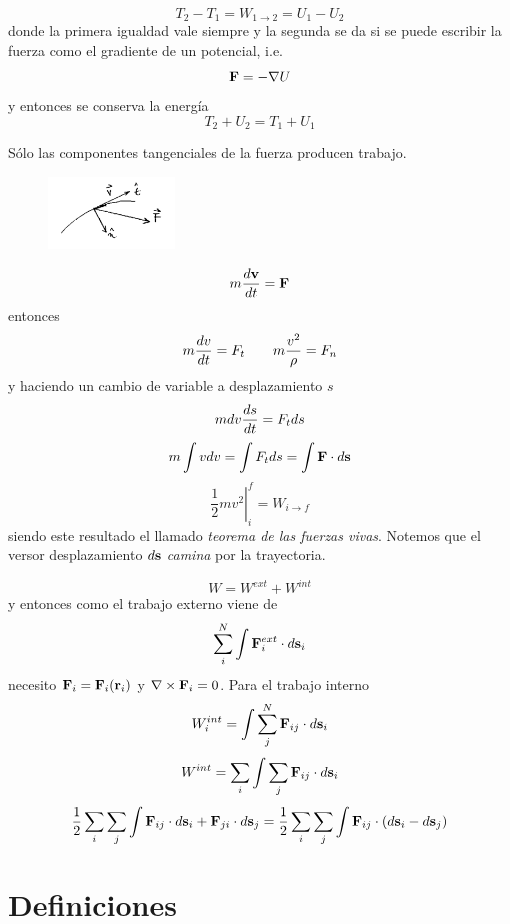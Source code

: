 \documentclass[10pt,oneside]{CBFT_book}
\begin{document}
\[
	T_2 - T_1 = W_{1 \to 2} = U_1 - U_2 
\]
donde la primera igualdad vale siempre y la segunda se da si se puede escribir la fuerza como el
gradiente de un potencial, i.e.
\[
	\vb{F} = - \nabla U
\]
y entonces se conserva la energía
\[
	T_2 + U_2 = T_1 + U_1
\]

Sólo las componentes tangenciales de la fuerza producen trabajo.
\begin{figure}[hbt]
	\begin{center}
	\includegraphics[width=0.3\textwidth]{images/fig_mc_workenergy.pdf}	
	\end{center}
	\caption{}
\end{figure} 

\[
	m \dtot{\vb{v}}{t} = \vb{F}
\]
entonces
\[
	m \frac{d^{\hspace{-0.05em}} {v}}{d {t}^{\hspace{-0.05em}}} = F_t \qquad m \frac{v^2}{\rho} = F_n
\]
y haciendo un cambio de variable a desplazamiento $s$
\[
	m dv \frac{d^{\hspace{-0.05em}} {s}}{d {t}^{\hspace{-0.05em}}} = F_t ds
\]
\[
	m \int v dv = \int F_t ds = \int \vb{F} \cdot d\vb{s}
\]
\[
	\left. \frac{1}{2} m v^2 \right|_i^f = W_{i \to f}
\]
siendo este resultado el llamado {\it teorema de las fuerzas vivas}. 
Notemos que el versor desplazamiento $d\vb{s}$ {\it camina} por la trayectoria.

\[
	W = W^{ext} + W^{int}
\]
y entonces como el trabajo externo viene de 
\[
	\sum_i^N \int \vb{F}^{ext}_i \cdot d\vb{s}_i
\]
necesito $\vb{F}_i = \vb{F}_i(\vb{r}_i)$ y $\nabla \times \vb{F}_i=0$.
Para el trabajo interno
\[
	W_i^{int} = \int \sum_j^N  \vb{F}_{ij} \cdot d\vb{s}_i
\]
\[
	W^{int} = \sum_i \int \sum_j  \vb{F}_{ij} \cdot d\vb{s}_i
\]
\[
	\frac{1}{2} \sum_i \sum_j \int \vb{F}_{ij} \cdot d\vb{s}_i + \vb{F}_{ji} \cdot d\vb{s}_j =
	\frac{1}{2} \sum_i \sum_j \int \vb{F}_{ij} \cdot \left( d\vb{s}_i - d\vb{s}_j \right)
\]

\section{Definiciones}
\end{document}
